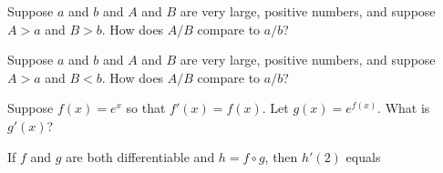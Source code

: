 \documentclass{ximera}
\newcommand{\recommendation}[1]{}
\newcommand{\GoodQuestions}[1]{}
\begin{document}
\begin{shuffle}
\begin{problem}
  Suppose $a$ and $b$ and $A$ and $B$ are very large, positive numbers, and suppose $A > a$ and $B > b$.  How does $A/B$ compare to $a/b$?
  \begin{multipleChoice}
  \end{multipleChoice}
\end{problem}

\begin{problem}
  Suppose $a$ and $b$ and $A$ and $B$ are very large, positive numbers, and suppose $A > a$ and $B < b$.  How does $A/B$ compare to $a/b$?
  \begin{multipleChoice}
  \end{multipleChoice}
\end{problem}



\begin{problem}
  Suppose $f(x) = e^x$ so that $f'(x) = f(x)$.  Let $g(x) = e^{f(x)}$.  What is $g'(x)$?
  \begin{multipleChoice}
  \end{multipleChoice}
\end{problem}


\begin{problem}
  If $f$ and $g$ are both differentiable and $h=f\circ g$,
  then $h'(2)$ equals
  \begin{multipleChoice}
  \end{multipleChoice}
\end{problem}


\end{shuffle}
\end{document}
